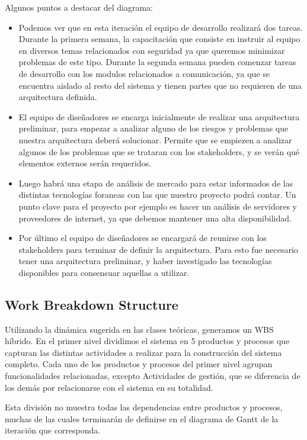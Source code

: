Algunos puntos a destacar del diagrama:
\begin{itemize}
 \item Podemos ver que en esta iteración el equipo de desarrollo realizará dos tareas. Durante la primera semana, la capacitación que consiste en instruir al equipo en diversos temas relacionados con seguridad ya que queremos minimizar problemas de este tipo. Durante la segunda semana pueden comenzar tareas de desarrollo con los modulos relacionados a comunicación, ya que se encuentra aislado al resto del sistema y tienen partes que no requieren de una arquitectura definida.
 \item El equipo de diseñadores se encarga inicialmente de realizar una arquitectura preliminar, para empezar a analizar alguno de los riesgos y problemas que nuestra arquitectura deberá solucionar. Permite que se empiezen a analizar algunos de los problemas que se trataran con los stakeholders, y se ver\'an qu\'e elementos externos serán requeridos.
 \item Luego habr\'a una etapa de an\'alisis de mercado para estar informados de las distintas tecnologías foraneas con las que nuestro proyecto podr\'a contar. Un punto clave para el proyecto por ejemplo es hacer un an\'alisis de servidores y proveedores de internet, ya que debemos mantener una alta disponibilidad.
 \item Por último el equipo de diseñadores se encargará de reunirse con los stakeholders para terminar de definir la arquitectura. Para esto fue necesario tener una arquitectura preliminar, y haber investigado las tecnologías disponibles para consensuar aquellas a utilizar. 
\end{itemize}
\renewcommand{\labelitemi}{}


\subsection{Work Breakdown Structure} 

Utilizando la dinámica sugerida en las clases teóricas, generamos un WBS híbrido. En el primer nivel dividimos el sistema en 5 productos y procesos que capturan las distintas actividades a realizar para la construcción del sistema completo. Cada uno de los productos y procesos del primer nivel agrupan funcionalidades relacionadas, excepto Actividades de gestión, que se diferencia de los demás por relacionarse con el sistema en su totalidad.

Esta división no muestra todas las dependencias entre productos y procesos, muchas de las cuales terminarán de definirse en el diagrama de Gantt de la iteración que corresponda.
\\ \par

